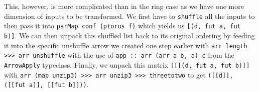 \documentclass{jfp1}
\newcommand{\inlinecode}[1]{\texttt{#1}}
\begin{document}
\\\\
This, however, is more complicated than in the ring case as we have one more dimension of inputs to be transformed. We first have to \inlinecode{shuffle} all the inputs to then pass it into \inlinecode{parMap conf (ptorus f)} which yields us \inlinecode{[(d, fut a, fut b)]}. We can then unpack this shuffled list back to its original ordering by feeding it into the specific unshuffle arrow we created one step earlier with \inlinecode{arr length >>> arr unshuffle} with the use of \inlinecode{app :: arr (arr a b, a) c} from the \inlinecode{ArrowApply} typeclass. Finally, we unpack this matrix \inlinecode{[[[(d, fut a, fut b)]]} with \inlinecode{arr (map unzip3) >>> arr unzip3 >>> threetotwo} to get  \inlinecode{([[d]], ([[fut a]], [[fut b]]))}.
\\\\
\end{document}
